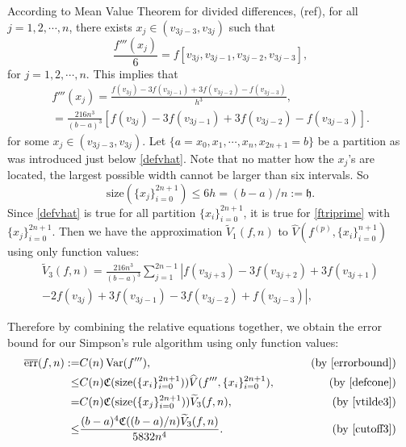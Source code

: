 \documentclass{iitthesis}
\DeclareMathOperator{\Var}{Var}
\theoremstyle{definition}
\theoremstyle{remark}
\begin{document}
According to Mean Value Theorem for divided differences, (ref), for all $j=1,2,\cdots,n$, there exists $x_j\in (v_{3j-3},v_{3j})$ such that
\begin{equation*}
    \frac{f'''(x_j)}{6}=f[v_{3j},v_{3j-1},v_{3j-2},v_{3j-3}],
\end{equation*}
for $j = 1, 2, \cdots, n.$ This implies that
\begin{multline}\label{ftriprime}
  f'''(x_j)=\frac{f(v_{3j})-3f(v_{3j-1})+3f(v_{3j-2})-f(v_{3j-3})}{h^3},\\=\frac{216n^3}{(b-a)^3}[f(v_{3j})-3f(v_{3j-1})+3f(v_{3j-2})-f(v_{3j-3})].
\end{multline}
for some $x_j\in (v_{3j-3},v_{3j})$. Let $\{a=x_{0}, x_{1},\cdots,x_{n},x_{2n+1}=b\}$ be a partition as was introduced just below \eqref{defvhat}. Note that no matter how the $x_j$'s are located, the largest possible width cannot be larger than six intervals. So
\begin{equation}\label{cutoff3}
    \text{size}(\{x_j\}_{i=0}^{2n+1})\leq 6h=(b-a)/n:=\mathfrak{h}.
\end{equation}
Since \eqref{defvhat} is true for all partition $\{x_i\}_{i=0}^{2n+1}$, it is true for \eqref{ftriprime} with $\{x_j\}_{i=0}^{2n+1}$. Then we have the approximation $\widetilde{V}_1(f,n)$ to $\widehat{V}(f^{(p)},\{x_i\}_{i=0}^{n+1})$ using only function values:
\begin{multline}\label{vtilde3}
\widetilde{V}_3(f,n)=\frac{216n^3}{(b-a)^3}\sum_{j=1}^{2n-1}\left|f(v_{3j+3})-3f(v_{3j+2})+3f(v_{3j+1})\right.\\\left.-2f(v_{3j})+3f(v_{3j-1})-3f(v_{3j-2})+f(v_{3j-3})\right|,
\end{multline}

Therefore by combining the relative equations together, we obtain the error bound for our Simpson's rule algorithm using only function values:
\begin{align}\label{errorsimcone}
\nonumber  \overline{\text{err}}(f,n):=&C(n)\Var(f'''),\qquad &\text{ (by \eqref{errorbound})}\\
\nonumber  \leq & C(n)\mathfrak{C}(\text{size}(\{x_i\}_{i=0}^{2n+1}))\widehat{V}(f''',\{x_i\}_{i=0}^{2n+1}), \qquad &\text{ (by \eqref{defcone})}\\
\nonumber  =& C(n)\mathfrak{C}(\text{size}(\{x_j\}_{i=0}^{2n+1}))\widetilde{V}_3(f,n), \qquad &\text{ (by \eqref{vtilde3})}\\
  \leq & \frac{(b-a)^4\mathfrak{C}((b-a)/n)\widetilde{V}_3(f,n)}{5832n^4}.\qquad &\text{ (by \eqref{cutoff3})}
\end{align}
\end{document}
